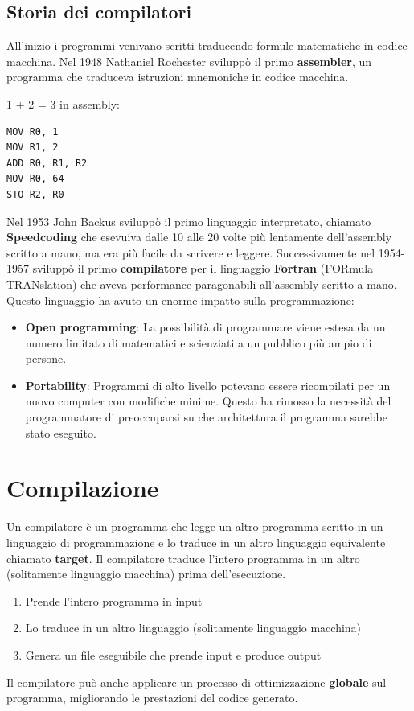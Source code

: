 \documentclass[a4paper]{article}
\begin{document}


\tableofcontents
\pagebreak


\subsection{Storia dei compilatori}
All'inizio i programmi venivano scritti traducendo formule matematiche in codice macchina.
Nel 1948 Nathaniel Rochester sviluppò il primo \textbf{assembler}, un programma che
traduceva istruzioni mnemoniche in codice macchina.
\begin{example}
  1 + 2 = 3 in assembly:
\begin{lstlisting}
MOV R0, 1
MOV R1, 2
ADD R0, R1, R2
MOV R0, 64
STO R2, R0
\end{lstlisting}
\end{example}

  \noindent
  Nel 1953 John Backus sviluppò il primo linguaggio interpretato, chiamato
  \textbf{Speedcoding} che esevuiva dalle 10 alle 20 volte più lentamente dell'assembly
  scritto a mano, ma era più facile da scrivere e leggere.
  Successivamente nel 1954-1957 sviluppò il primo \textbf{compilatore} per il linguaggio
  \textbf{Fortran} (FORmula TRANslation) che aveva performance paragonabili all'assembly
  scritto a mano. Questo linguaggio ha avuto un enorme impatto sulla programmazione:
  \begin{itemize}
    \item \textbf{Open programming}: La possibilità di programmare viene estesa da un numero limitato di matematici
      e scienziati a un pubblico più ampio di persone.

    \item \textbf{Portability}: Programmi di alto livello potevano essere ricompilati
      per un nuovo computer con modifiche minime. Questo ha rimosso la necessità
      del programmatore di preoccuparsi su che architettura il programma sarebbe stato
      eseguito.
  \end{itemize}

\section{Compilazione}
Un compilatore è un programma che legge un altro programma scritto in un linguaggio
di programmazione e lo traduce in un altro linguaggio equivalente chiamato
\textbf{target}. Il compilatore traduce l'intero programma in un altro (solitamente
linguaggio macchina) prima dell'esecuzione.
\begin{enumerate}
  \item Prende l'intero programma in input
  \item Lo traduce in un altro linguaggio (solitamente linguaggio macchina)
  \item Genera un file eseguibile che prende input e produce output
\end{enumerate}
Il compilatore può anche applicare un processo di ottimizzazione \textbf{globale}
sul programma, migliorando le prestazioni del codice generato.
\end{document}
